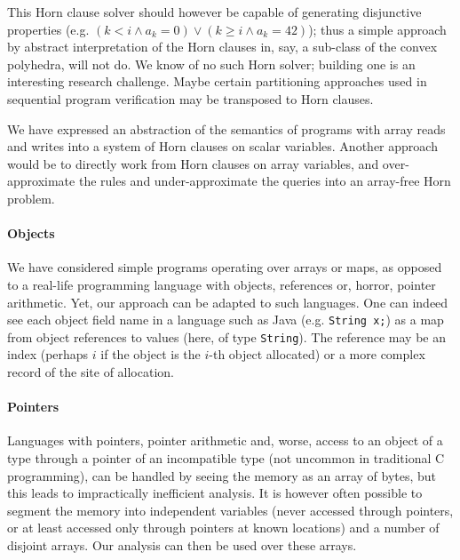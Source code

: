 \documentclass[a4paper]{article}
\theoremstyle{definition}
\theoremstyle{plain}
\begin{document}
This Horn clause solver should however be capable of generating disjunctive properties (e.g. $(k < i \land a_k = 0) \lor (k \geq i \land a_k = 42)$); thus a simple approach by abstract interpretation of the Horn clauses in, say, a sub-class of the convex polyhedra, will not do.
We know of no such Horn solver; building one is an interesting research challenge.
Maybe certain partitioning approaches used in sequential program verification \cite{DBLP:journals/toplas/RivalM07,HenryMM12} may be transposed to Horn clauses.

We have expressed an abstraction of the semantics of programs with array reads and writes into a system of Horn clauses on scalar variables.
Another approach would be to directly work from Horn clauses on array variables, and over-approximate the rules and under-approximate the queries into an array-free Horn problem.
\smallskip

\paragraph{Objects} We have considered simple programs operating over arrays or maps, as opposed to a real-life programming language with objects, references or, horror, pointer arithmetic. Yet, our approach can be adapted to such languages.
\lstset{language=Java}
One can indeed see each object field name in a language such as Java (e.g. \lstinline|String x;|) as a map from object references to values (here, of type \lstinline|String|).
The reference may be an index (perhaps $i$ if the object is the $i$-th object allocated) or a more complex record of the site of allocation.

\paragraph{Pointers} Languages with pointers, pointer arithmetic and, worse, access to an object of a type through a pointer of an incompatible type (not uncommon in traditional C programming), can be handled by seeing the memory as an array of bytes, but this leads to impractically inefficient analysis.
It is however often possible to segment the memory into independent variables (never accessed through pointers, or at least accessed only through pointers at known locations) and a number of disjoint arrays.
Our analysis can then be used over these arrays.

\printbibliography

\newpage
\appendix
\end{document}
